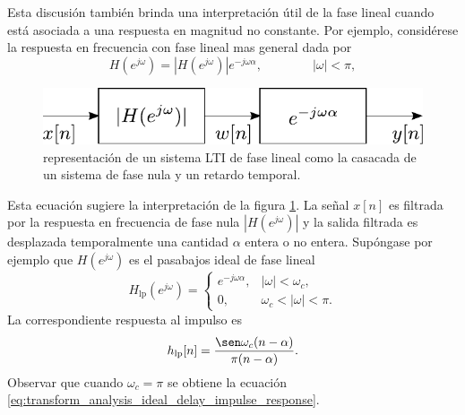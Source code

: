 \documentclass[a4paper]{report}
\begin{document}
Esta discusión también brinda una interpretación útil de la fase lineal cuando está asociada a una respuesta en magnitud no constante. Por ejemplo, considérese la respuesta en frecuencia con fase lineal mas general dada por
\[
 H(e^{j\omega})=|H(e^{j\omega})|e^{-j\omega\alpha},
  \qquad\qquad 
 |\omega|<\pi,
\]
\begin{figure}[!htb]
 \begin{minipage}[c]{0.42\textwidth}
  \includegraphics[width=\textwidth]{figuras/linear_phase_lti_system_cascade.pdf}
 \end{minipage}\hfill
 \begin{minipage}[c]{0.48\textwidth}
 \caption{representación de un sistema LTI de fase lineal como la casacada de un sistema de fase nula y un retardo temporal.
 }\label{fig:linear_phase_lti_system_cascade}
 \end{minipage}
\end{figure}
Esta ecuación sugiere la interpretación de la figura \ref{fig:linear_phase_lti_system_cascade}. La señal \(x[n]\) es filtrada por la respuesta en frecuencia de fase nula \(|H(e^{j\omega})|\) y la salida filtrada es desplazada temporalmente una cantidad \(\alpha\) entera o no entera. 
Supóngase por ejemplo que \(H(e^{j\omega})\) es el pasabajos ideal de fase lineal
\[
 H_\textrm{lp}(e^{j\omega})=
 \left\{
 \begin{array}{ll}
  e^{-j\omega\alpha}, &|\omega|<\omega_c,\\
  0,                  &\omega_c<|\omega|<\pi.
 \end{array}
 \right.
\]
La correspondiente respuesta al impulso es
\begin{equation}\label{eq:transform_analysis_ideal_lowpass_impulse_response}
 h_\textrm{lp}[n]=\frac{\sen\omega_c(n-\alpha)}{\pi(n-\alpha)}. 
\end{equation}
Observar que cuando \(\omega_c=\pi\) se obtiene la ecuación \ref{eq:transform_analysis_ideal_delay_impulse_response}.
\end{document}
